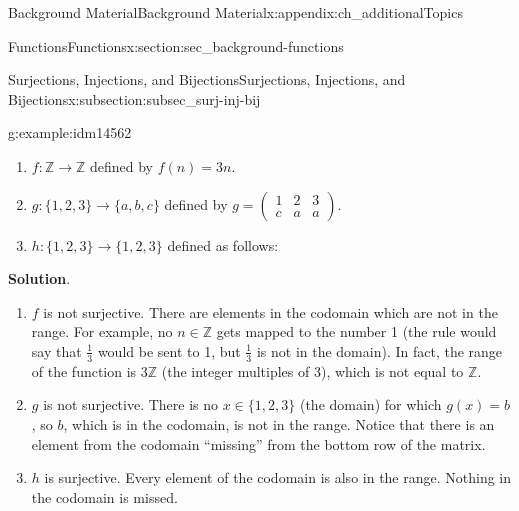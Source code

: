 \documentclass[oneside,10pt,]{book}
\numberwithin{equation}{chapter}
\def\Z{\mathbb Z}
\newcommand{\amp}{&}
\begin{document}
\begin{appendixptx}{Background Material}{}{Background Material}{}{}{x:appendix:ch_additionalTopics}
\begin{sectionptx}{Functions}{}{Functions}{}{}{x:section:sec_background-functions}
\begin{subsectionptx}{Surjections, Injections, and Bijections}{}{Surjections, Injections, and Bijections}{}{}{x:subsection:subsec_surj-inj-bij}
\begin{example}{}{g:example:idm14562}
\par
%
\begin{enumerate}
\item{}\(f:\Z \to \Z\) defined by \(f(n) = 3n\).%
\item{}\(g: \{1,2,3\} \to \{a,b,c\}\) defined by \(g = \begin{pmatrix}1 \amp 2 \amp 3 \\ c \amp a \amp a \end{pmatrix}\).%
\item{}\(h:\{1,2,3\} \to \{1,2,3\}\) defined as follows:%
\begin{sidebyside}{1}{0.4}{0.4}{0}%
\begin{sbspanel}{0.2}%
%
\end{sbspanel}%
\end{sidebyside}%
\end{enumerate}
%
\par\smallskip%
\noindent\textbf{Solution}.\hypertarget{g:solution:idm14579}{}\quad{}%
\begin{enumerate}
\item{}\(f\) is not surjective. There are elements in the codomain which are not in the range. For example, no \(n \in \Z\) gets mapped to the number 1 (the rule would say that \(\frac{1}{3}\) would be sent to 1, but \(\frac{1}{3}\) is not in the domain). In fact, the range of the function is \(3\Z\) (the integer multiples of 3), which is not equal to \(\Z\).%
\item{}\(g\) is not surjective. There is no \(x \in \{1,2,3\}\) (the domain) for which \(g(x) = b\), so \(b\), which is in the codomain, is not in the range. Notice that there is an element from the codomain ``missing'' from the bottom row of the matrix.%
\item{}\(h\) is surjective. Every element of the codomain is also in the range. Nothing in the codomain is missed.%
\end{enumerate}
%
\end{example}

\end{subsectionptx}
\end{sectionptx}
\end{appendixptx}
\end{document}
